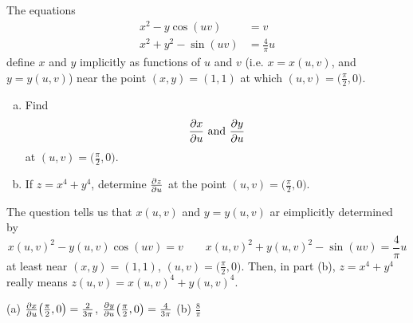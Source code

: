 \begin{question}[M200 2001D] %
The equations
\begin{align*}
x^2-y\cos(uv)&=v\\
x^2+y^2-\sin(uv)&=\frac{4}{\pi}u
\end{align*}
define $x$ and $y$ implicitly as functions of $u$ and $v$ (i.e. $x=x(u,v)$,
and $y=y(u,v)$) near the point $(x,y)=(1,1)$ at which 
$(u,v)=\big(\frac{\pi}{2},0\big)$.
\begin{enumerate}[(a)]
\item
Find
\begin{equation*}
\pdiff{x}{u}\text{ and }
\pdiff{y}{u}
\end{equation*}
at $(u,v)=\big(\frac{\pi}{2},0\big)$.

\item 
If $z=x^4+y^4$, determine $\pdiff{z}{u}$
at the point $(u,v)=\big(\frac{\pi}{2},0\big)$.
\end{enumerate}
\end{question}

\begin{hint}
The question tells us that $x(u,v)$ and $y=y(u,v)$ ar eimplicitly determined by
\begin{equation*}
x(u,v)^2-y(u,v)\cos(uv)=v\qquad
x(u,v)^2+y(u,v)^2-\sin(uv)=\frac{4}{\pi}u
\end{equation*}
at least near $(x,y)=(1,1)$, $(u,v)=\big(\frac{\pi}{2},0\big)$.
Then, in part (b), $z=x^4+y^4$ really means $z(u,v)=x(u,v)^4+y(u,v)^4$.
\end{hint}

\begin{answer}
(a) $\pdiff{x}{u}\big(\frac{\pi}{2},0\big)=\frac{2}{3\pi}$,
$\pdiff{y}{u}\big(\frac{\pi}{2},0\big)=\frac{4}{3\pi}$\qquad
(b) $\frac{8}{\pi}$
\end{answer}

